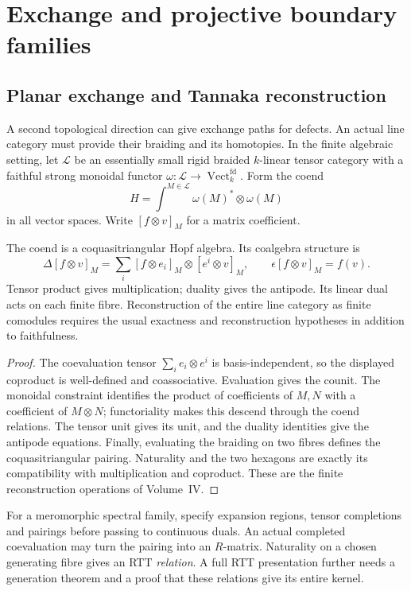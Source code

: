 \chapter{Exchange and projective boundary families}

\section{Planar exchange and Tannaka reconstruction}
A second topological direction can give exchange paths for defects. An
actual line category must provide their braiding and its homotopies. In the
finite algebraic setting, let $\mathscr L$ be an essentially small rigid
braided $k$-linear tensor category with a faithful strong monoidal functor
$\omega:\mathscr L\to\operatorname{Vect}_{k}^{\mathrm{fd}}$. Form the coend
\[
 H=\int^{M\in\mathscr L}\omega(M)^*\otimes\omega(M)
\]
in all vector spaces. Write $[f\otimes v]_M$ for a matrix coefficient.

\begin{theorem}
The coend is a coquasitriangular Hopf algebra. Its coalgebra structure is
\[
 \Delta[f\otimes v]_M
   =\sum_i[f\otimes e_i]_M\otimes[e^i\otimes v]_M,
 \qquad \epsilon[f\otimes v]_M=f(v).
\]
Tensor product gives multiplication; duality gives the antipode. Its linear
dual acts on each finite fibre. Reconstruction of the entire line category
as finite comodules requires the usual exactness and reconstruction
hypotheses in addition to faithfulness.
\end{theorem}
\begin{proof}
The coevaluation tensor $\sum_i e_i\otimes e^i$ is basis-independent, so
the displayed coproduct is well-defined and coassociative. Evaluation gives
the counit. The monoidal constraint identifies the product of coefficients
of $M,N$ with a coefficient of $M\otimes N$; functoriality makes this
descend through the coend relations. The tensor unit gives its unit, and
the duality identities give the antipode equations. Finally, evaluating
the braiding on two fibres defines the coquasitriangular pairing. Naturality
and the two hexagons are exactly its compatibility with multiplication and
coproduct. These are the finite reconstruction operations of Volume~IV.
\end{proof}

For a meromorphic spectral family, specify expansion regions, tensor
completions and pairings before passing to continuous duals. An actual
completed coevaluation may turn the pairing into an $R$-matrix. Naturality
on a chosen generating fibre gives an RTT \emph{relation}. A full RTT
presentation further needs a generation theorem and a proof that these
relations give its entire kernel.

